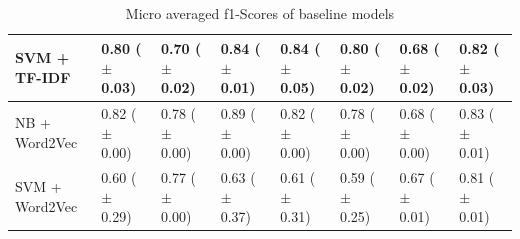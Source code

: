\documentclass[a4paper,twoside,phd]{BYUPhys}
\begin{document}
\begin{table}[H]
\begin{tabular}{|p{1.7cm}|p{1.6cm}|p{1.6cm}|p{1.6cm}|p{1.6cm}|p{1.6cm}|p{1.6cm}|p{1.6cm}|}
		SVM + TF-IDF  & 0.80 \newline ($\pm$ 0.03) & 0.70 \newline ($\pm$ 0.02) & 0.84 \newline ($\pm$ 0.01) & 0.84 \newline ($\pm$ 0.05) & 0.80 \newline ($\pm$ 0.02)  & 0.68 \newline ($\pm$ 0.02)  & 0.82 \newline ($\pm$ 0.03)                                                                                                                                             \\
		\hline                                                                                                                                              
		
		NB + Word2Vec  & 0.82 \newline ($\pm$ 0.00) & 0.78 \newline ($\pm$ 0.00) & 0.89 \newline ($\pm$ 0.00) & 0.82 \newline ($\pm$ 0.00) & 0.78 \newline ($\pm$ 0.00)  & 0.68 \newline ($\pm$ 0.00)   & 0.83 \newline ($\pm$ 0.01)  \\
		\hline
		
		SVM + Word2Vec  & 0.60 \newline ($\pm$ 0.29) & 0.77 \newline ($\pm$ 0.00) & 0.63 \newline ($\pm$ 0.37) & 0.61 \newline ($\pm$ 0.31) & 0.59 \newline ($\pm$ 0.25)  & 0.67 \newline ($\pm$ 0.01) & 0.81 \newline ($\pm$ 0.01)                                                                                                                                              \\
		\hline
		
	                                                                             
		                                                                                                                                                                                         
	\end{tabular}
	\caption{Micro averaged f1-Scores of baseline models}
	\label{table:BaselineAccuracy}
\end{table}
\end{document}

